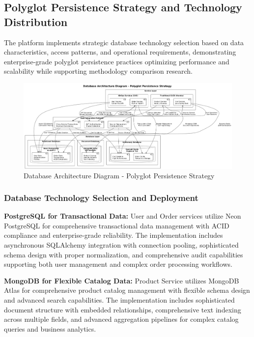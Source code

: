 \subsection{Polyglot Persistence Strategy and Technology Distribution}

The platform implements strategic database technology selection based on data characteristics, access patterns, and operational requirements, demonstrating enterprise-grade polyglot persistence practices optimizing performance and scalability while supporting methodology comparison research.

\begin{figure}[H]
\centering
\includegraphics[width=1.0\textwidth]{figures/Database-Architecture-Diagram.png}
\caption{Database Architecture Diagram - Polyglot Persistence Strategy}
\label{fig:database-architecture-diagram}
\end{figure}

\subsubsection{Database Technology Selection and Deployment}



\textbf{PostgreSQL for Transactional Data:}
User and Order services utilize Neon PostgreSQL for comprehensive transactional data management with ACID compliance and enterprise-grade reliability. The implementation includes asynchronous SQLAlchemy integration with connection pooling, sophisticated schema design with proper normalization, and comprehensive audit capabilities supporting both user management and complex order processing workflows.

\textbf{MongoDB for Flexible Catalog Data:}
Product Service utilizes MongoDB Atlas for comprehensive product catalog management with flexible schema design and advanced search capabilities. The implementation includes sophisticated document structure with embedded relationships, comprehensive text indexing across multiple fields, and advanced aggregation pipelines for complex catalog queries and business analytics.

